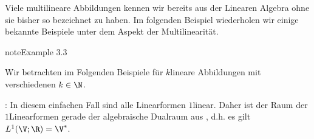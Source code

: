 \documentclass[letterpaper,10pt,english]{jupyterBook}
\begin{document}
\sphinxAtStartPar
Viele multilineare Abbildungen kennen wir bereits aus der Linearen Algebra ohne sie bisher so bezeichnet zu haben.
Im folgenden Beispiel wiederholen wir einige bekannte Beispiele unter dem Aspekt der Multilinearität.
\label{vektoranalysis/multilinear:ex:multilinear}
\begin{sphinxadmonition}{note}{Example 3.3}



\sphinxAtStartPar
Wir betrachten im Folgenden Beispiele für \(k\)\sphinxhyphen{}lineare Abbildungen mit verschiedenen \(k\in\N\).

\sphinxAtStartPar
{}: In diesem einfachen Fall sind alle Linearformen \(1\)\sphinxhyphen{}linear.
Daher ist der Raum der \(1\)\sphinxhyphen{}Linearformen gerade der algebraische Dualraum aus {\hyperref[\detokenize{vektoranalysis/multilinear:def:algebraischerDualraum}]{}}, d.h. es gilt \(L^1(\V; \R) = \V^\ast\).


\end{sphinxadmonition}
\end{document}
